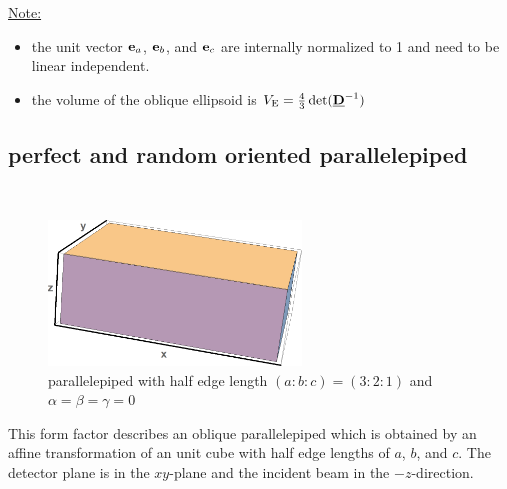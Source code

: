 \noindent\uline{Note:}
\begin{itemize}
\item the unit vector $\B{e}_a$, $\B{e}_b$, and $\B{e}_c$ are internally normalized to 1 and need to be linear independent.
\item the volume of the oblique ellipsoid is $V_\mathrm{E}=\frac43\det(\M{D}^{-1})$
\end{itemize}

\subsection{perfect and random oriented parallelepiped} ~\\

\begin{figure}[htb]
\begin{center}
\includegraphics[width=0.6\textwidth]{../images/form_factor/supershapes/parallel_epiped321.png}
\end{center}
\caption{parallelepiped with half edge length $(a:b:c)=(3:2:1)$ and $\alpha=\beta=\gamma=0$}
\label{fig:opo_cube}
\end{figure}

This form factor describes an oblique parallelepiped which is obtained by an affine transformation of an unit cube with half edge lengths of $a$, $b$, and $c$. The detector plane is in the $xy$-plane and the incident beam in the $-z$-direction.


